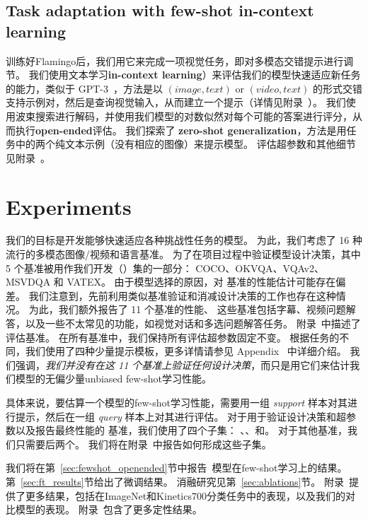 \subsection{Task adaptation with few-shot in-context learning}
\label{sec:adapt-vlm}

训练好Flamingo后，我们用它来完成一项视觉任务，即对多模态交错提示进行调节。%
我们使用文本学习\textbf{in-context learning}）来评估我们的模型快速适应新任务的能力，类似于 GPT-3~\citep{gpt3}，方法是以 $(image, text)$ or $(video, text)$ 的形式交错支持示例对，然后是查询视觉输入，从而建立一个提示（详情见附录~）。
我们使用波束搜索进行解码，并使用我们模型的对数似然对每个可能的答案进行评分，从而执行\textbf{open-ended}评估。
我们探索了 \textbf{zero-shot generalization}，方法是用任务中的两个纯文本示例（没有相应的图像）来提示模型。
评估超参数和其他细节见附录~。



\section{Experiments}
\label{sec:experiments}
我们的目标是开发能够快速适应各种挑战性任务的模型。
为此，我们考虑了 16 种流行的多模态图像/视频和语言基准。
为了在项目过程中验证模型设计决策，其中 5 个基准被用作我们开发（\dev{}）集的一部分： COCO、OKVQA、VQAv2、MSVDQA 和 VATEX。
由于模型选择的原因，对 \dev{} 基准的性能估计可能存在偏差。
我们注意到，先前利用类似基准验证和消减设计决策的工作也存在这种情况。
为此，我们额外报告了 11 个基准的性能、
这些基准包括字幕、视频问题解答，以及一些不太常见的功能，如视觉对话和多选问题解答任务。
附录~中描述了评估基准。
在所有基准中，我们保持所有评估超参数固定不变。
根据任务的不同，我们使用了四种少量提示模板，更多详情请参见 
Appendix~ 中详细介绍。
我们强调，\emph{我们并没有在这 11 个基准上验证任何设计决策}，而只是用它们来估计我们模型的无偏少量unbiased few-shot学习性能。


具体来说，要估算一个模型的few-shot学习性能，需要用一组 \emph{support} 样本对其进行提示，然后在一组 \emph{query} 样本上对其进行评估。
对于用于验证设计决策和超参数以及报告最终性能的 \dev{} 基准，我们使用了四个子集：
\metadevsupportshort{}、\metadevqueryshort{}、\metatestsupportshort{}和\metatestqueryshort{}。
对于其他基准，我们只需要后两个。
我们将在附录~中报告如何形成这些子集。

我们将在第~\ref{sec:fewshot_openended}节中报告~\method{}模型在few-shot学习上的结果。
第~\ref{sec:ft_results}节给出了微调结果。
消融研究见第~\ref{sec:ablations}节。
附录~提供了更多结果，包括\method{}在ImageNet和Kinetics700分类任务中的表现，以及我们的对比模型的表现。
附录~包含了更多定性结果。





